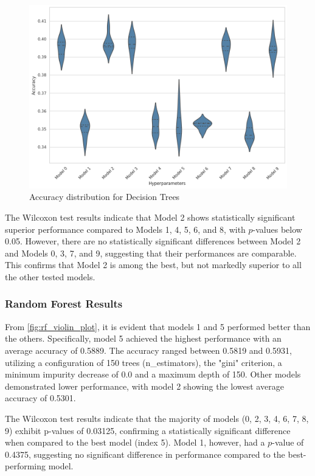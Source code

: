 \begin{figure}[H]
    \centering
    \includegraphics[width=0.99\columnwidth]{images/violin_plot_decision_tree.png}
    \caption{Accuracy distribution for Decision Trees}
    \label{fig:dt_violin_plot}
\end{figure}

The Wilcoxon test results indicate that Model 2 shows 
statistically significant superior performance compared 
to Models 1, 4, 5, 6, and 8, with \( p \)-values below 0.05. 
However, there are no statistically significant differences 
between Model 2 and Models 0, 3, 7, and 9, suggesting 
that their performances are comparable. 
This confirms that Model 2 is among the best, 
but not markedly superior to all the other tested models.

\subsubsection{Random Forest Results}
From \autoref{fig:rf_violin_plot}, it is evident 
that models 1 and 5 performed better than the others. 
Specifically, model 5 achieved the highest performance 
with an average accuracy of 0.5889. 
The accuracy ranged between 0.5819 and 
0.5931, utilizing a configuration of 
150 trees (n\_estimators), 
the "gini" criterion, a minimum impurity decrease of 0.0 and a maximum depth
of 150. Other models demonstrated lower 
performance, with model 2 showing the lowest average 
accuracy of {0.5301}.

The {Wilcoxon test} results indicate that the 
majority of models (0, 2, 3, 4, 6, 7, 8, 9) exhibit 
{p-values} of {0.03125}, confirming a 
statistically significant difference when compared to 
the best model (index 5). Model 1, however, had a \( p \)-value
of {0.4375}, suggesting no significant difference 
in performance compared to the best-performing model.

